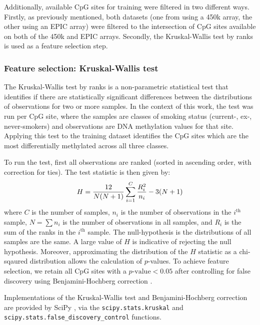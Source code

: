 \documentclass{article}
\newcommand{\equationname}[1]{%
    \begingroup
        \leavevmode
        \addcontentsline{equ}{equations}{\protect\numberline{\theequation}#1}%
    \endgroup   
}
\begin{document}
Additionally, available CpG sites for training were filtered in two different ways. Firstly, as previously mentioned, both datasets (one from using a 450k array, the other using an EPIC array) were filtered to the intersection of CpG sites available on both of the 450k and EPIC arrays. Secondly, the Kruskal-Wallis test by ranks is used as a feature selection step.

\subsubsection{Feature selection: Kruskal-Wallis test} \label{sec:feature-selection}
The Kruskal-Wallis test by ranks \cite{Kruskal1952UseOR} is a non-parametric statistical test that identifies if there are statistically significant differences between the distributions of observations for two or more samples. In the context of this work, the test was run per CpG site, where the samples are classes of smoking status (current-, ex-, never-smokers) and observations are DNA methylation values for that site. Applying this test to the training dataset identifies the CpG sites which are the most differentially methylated across all three classes.

To run the test, first all observations are ranked (sorted in ascending order, with correction for ties). The test statistic is then given by:
\begin{equation} \equationname{Kruskal-Wallis test by ranks}
    H = \frac{12}{N(N + 1)}\sum_{i=1}^{C}\frac{R_i^2}{n_i} - 3(N + 1)
\end{equation}
where \(C\) is the number of samples, \(n_i\) is the number of observations in the \(i^\text{th}\) sample, \(N = \sum n_i\) is the number of observations in all samples, and \(R_i\) is the sum of the ranks in the \(i^\text{th}\) sample. The null-hypothesis is the distributions of all samples are the same. A large value of \(H\) is indicative of rejecting the null hypothesis. Moreover, approximating the distribution of the \(H\) statistic as a chi-sqaured distribution allows the calculation of \(p\)-values. To achieve feature selection, we retain all CpG sites with a \(p\text{-value} < 0.05\) after controlling for false discovery using Benjamini-Hochberg correction \cite{benjamini1995controlling}.

Implementations of the Kruskal-Wallis test and Benjamini-Hochberg correction are provided by SciPy \cite{SciPy}, via the \verb|scipy.stats.kruskal| and \verb|scipy.stats.false_discovery_control| functions.
\end{document}
